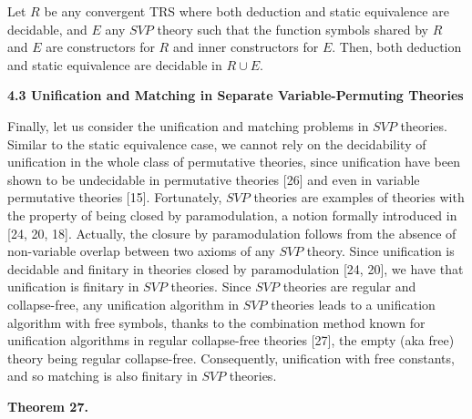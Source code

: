 \documentclass[10pt,a4paper]{amsart}
\begin{document}
 
Let $R$ be any convergent TRS where both deduction and static equivalence are decidable, and $E$ any $\mathit{SVP}$ theory such that the function symbols shared by $R$ and $E$ are constructors for $R$ and inner constructors for $E$. Then, both deduction and static equivalence are decidable in $R\cup E$.\par
 
 
 
 
 
 
\par\medskip\noindent\textbf{4.3 Unification and Matching in Separate Variable-Permuting Theories}\par
 
 
Finally, let us consider the unification and matching problems in $\mathit{SVP}$ theories. Similar to the static equivalence case, we cannot rely on the decidability of unification in the whole class of permutative theories, since unification have been shown to be undecidable in permutative theories [26] and even in variable permutative theories [15]. Fortunately, $\mathit{SVP}$ theories are examples of theories with the property of being closed by paramodulation, a notion formally introduced in [24, 20, 18]. Actually, the closure by paramodulation follows from the absence of non-variable overlap between two axioms of any $\mathit{SVP}$ theory. Since unification is decidable and finitary in theories closed by paramodulation [24, 20], we have that unification is finitary in $\mathit{SVP}$ theories. Since $\mathit{SVP}$ theories are regular and collapse-free, any unification algorithm in $\mathit{SVP}$ theories leads to a unification algorithm with free symbols, thanks to the combination method known for unification algorithms in regular collapse-free theories [27], the empty (aka free) theory being regular collapse-free. Consequently, unification with free constants, and so matching is also finitary in $\mathit{SVP}$ theories.\par
 
 
 
\par\medskip\noindent\textbf{Theorem 27.}\par
 
\end{document}
